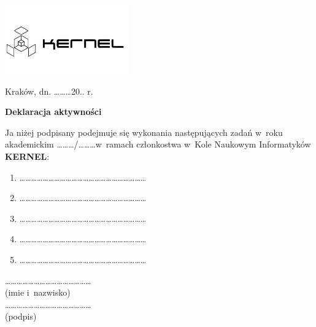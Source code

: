 \documentclass[a4paper,12pt]{article}
\begin{document}
\begin{flushright}
	\includegraphics[width=0.4\textwidth]{./../logo}
\end{flushright}
\vspace{-50pt}
Kraków, dn. \ldots\ldots\ldots 20.. r.\\
\begin{center}
\vspace{50pt}
\Large{\textbf{Deklaracja aktywności}}
\end{center}
\vspace{20pt}
Ja niżej podpisany podejmuje się wykonania następujących zadań w~roku akademickim \ldots\ldots\ldots/\ldots\ldots\ldots w~ramach członkostwa w~Kole Naukowym Informatyków \textbf{KERNEL}:\\
\begin{enumerate}
\item \ldots\ldots\ldots\ldots\ldots\ldots\ldots\ldots\ldots\ldots\ldots\ldots\ldots\ldots\ldots\ldots\ldots\ldots\ldots\ldots\ldots\ldots
\item \ldots\ldots\ldots\ldots\ldots\ldots\ldots\ldots\ldots\ldots\ldots\ldots\ldots\ldots\ldots\ldots\ldots\ldots\ldots\ldots\ldots\ldots
\item \ldots\ldots\ldots\ldots\ldots\ldots\ldots\ldots\ldots\ldots\ldots\ldots\ldots\ldots\ldots\ldots\ldots\ldots\ldots\ldots\ldots\ldots
\item \ldots\ldots\ldots\ldots\ldots\ldots\ldots\ldots\ldots\ldots\ldots\ldots\ldots\ldots\ldots\ldots\ldots\ldots\ldots\ldots\ldots\ldots
\item \ldots\ldots\ldots\ldots\ldots\ldots\ldots\ldots\ldots\ldots\ldots\ldots\ldots\ldots\ldots\ldots\ldots\ldots\ldots\ldots\ldots\ldots
\end{enumerate}
\vspace{50pt}
\begin{flushright}
\normalsize
\ldots\ldots\ldots\ldots\ldots\ldots\ldots\ldots\ldots\ldots\ldots\ldots\ldots\ldots\ldots\\
\footnotesize (imie i~nazwisko)\\
\normalsize
\vspace{40pt}
\ldots\ldots\ldots\ldots\ldots\ldots\ldots\ldots\ldots\ldots\ldots\ldots\ldots\ldots\ldots\\
\footnotesize (podpis)\\
\end{flushright}
\end{document}

